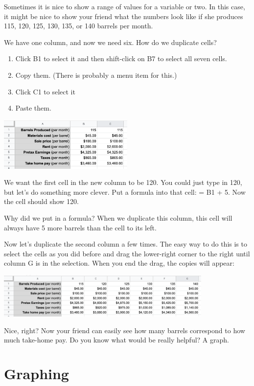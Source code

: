 Sometimes it is nice to show a range of values for a variable or two.
In this case, it might be nice to show your friend what the numbers
look like if she produces 115, 120, 125, 130, 135, or 140 barrels per
month.

We have one column, and now we need six. How do we duplicate cells?
\begin{enumerate}
\item Click B1 to select it and then shift-click on B7 to select all seven cells.
\item Copy them. (There is probably a menu item for this.)
\item Click C1 to select it
\item Paste them.
\end{enumerate}

\includegraphics[width=0.5\textwidth]{BarrelCopyPaste.png}

We want the first cell in the new column to be 120. You could just
type in 120, but let's do something more clever.  Put a formula into that
cell: = B1 + 5.  Now the cell should show 120.

Why did we put in a formula? When we duplicate this column, this cell
will always have 5 more barrels than the cell to its left.

Now let's duplicate the second column a few times. The easy way to do
this is to select the cells as you did before and drag the lower-right
corner to the right until column G is in the selection. When you end
the drag, the copies will appear:

\includegraphics[width=0.8\textwidth]{BarrelDragPaste.png}

Nice, right? Now your friend can easily see how many barrels
correspond to how much take-home pay. Do you know what would be really helpful? A graph.

\section{Graphing}

